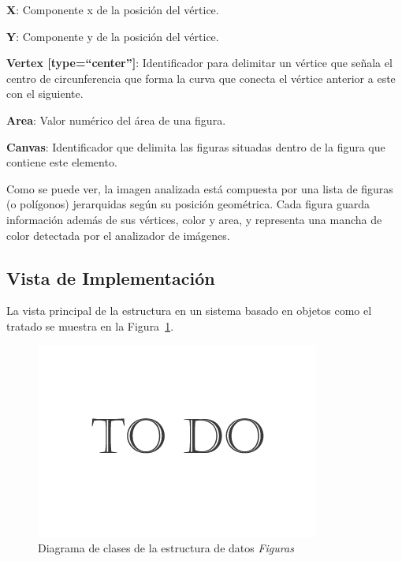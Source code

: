 \begin{longenum}
\begin{longenum}
\begin{longenum}
\begin{longenum}
\begin{longenum}
						\item \textbf{X}: Componente x de la posición del vértice.
						\item \textbf{Y}: Componente y de la posición del vértice.
						\end{longenum}
					\item \textbf{Vertex [type=``center'']}: Identificador para delimitar un vértice que señala el centro de circunferencia que forma la curva que conecta el vértice anterior a este con el siguiente.
				\end{longenum}
			\end{longenum}
		\end{longenum}
		\item \textbf{Area}: Valor numérico del área de una figura.
		\item \textbf{Canvas}: Identificador que delimita las figuras situadas dentro de la figura que contiene este elemento. 
	\end{longenum}
	
	Como se puede ver, la imagen analizada está compuesta por una lista de figuras (o polígonos) jerarquidas según su posición geométrica. Cada figura guarda información además de sus vértices, color y area, y representa una mancha de color detectada por el analizador de imágenes.


\subsection{Vista de Implementación}

	La vista principal de la estructura en un sistema basado en objetos como el tratado se muestra en la Figura~\ref{fig:diagramaClasesFigure}.\\

		\begin{figure}[htbp]
		\centering
		\includegraphics[scale=0.47]{graphics/todo.png}
		\caption{Diagrama de clases de la estructura de datos \emph{Figuras}}
		\label{fig:diagramaClasesFigure}
		\end{figure}
		
